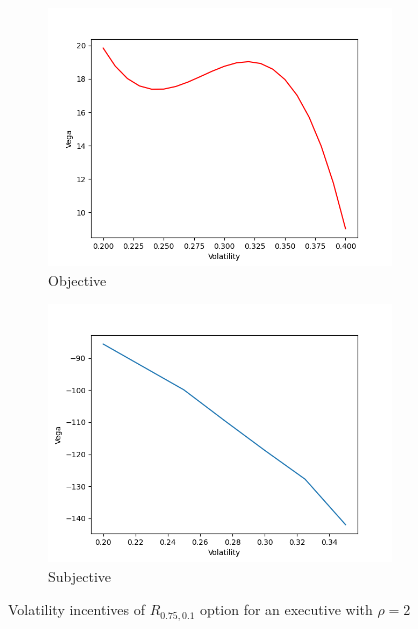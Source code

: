 \vspace*{15pt}
\begin{figure}[H]
    \centering
    \begin{subfigure}{0.45\textwidth}
        \centering
        \includegraphics[width=\textwidth]{fig/4/r_vega_obj.png}
        \caption{Objective}
        \label{fig:r_vega_obj}
    \end{subfigure}
    \hfill
    \begin{subfigure}{0.45\textwidth}
        \centering
        \includegraphics[width=\textwidth]{fig/4/r_vega_subj.png}
        \caption{Subjective}
        \label{fig:r_vega_subj}
    \end{subfigure}
    \caption{Volatility incentives of $R_{0.75, 0.1}$ option for an executive with $\rho = 2$}
    \label{fig:r_vega_both}
\end{figure}
\vspace*{15pt}
